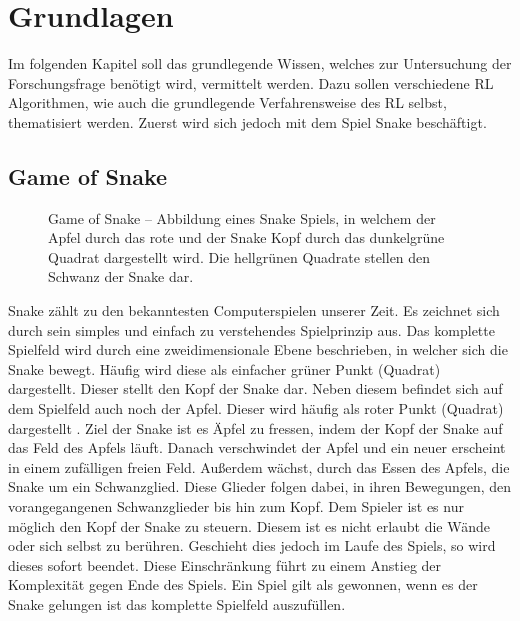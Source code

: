 
\chapter{Grundlagen}\label{chap:Grundlagen}
Im folgenden Kapitel soll das grundlegende Wissen, welches zur Untersuchung der Forschungsfrage benötigt wird, vermittelt werden. Dazu sollen verschiedene RL Algorithmen, wie auch die grundlegende Verfahrensweise des RL selbst, thematisiert werden. Zuerst wird sich jedoch mit dem Spiel Snake beschäftigt. 

\section{Game of Snake} \label{sec:Grundlagen_Game_of_Snake}
\begin{figure}[H]
	\centering
	
	\caption[Game of Snake]{Game of Snake -- Abbildung eines Snake Spiels, in welchem der Apfel durch das rote und der Snake Kopf durch das dunkelgrüne Quadrat dargestellt wird. Die hellgrünen Quadrate stellen den Schwanz der Snake dar.}
	\label{fig:Grundlagen_Game_of_Snake}
\end{figure}
Snake zählt zu den bekanntesten Computerspielen unserer Zeit. Es zeichnet sich durch sein simples und einfach zu verstehendes Spielprinzip aus.
Das komplette Spielfeld wird durch eine zweidimensionale Ebene beschrieben, in welcher sich die Snake bewegt. Häufig wird diese als einfacher grüner Punkt (Quadrat) dargestellt. Dieser stellt den Kopf der Snake dar. Neben diesem befindet sich auf dem Spielfeld auch noch der Apfel. Dieser wird häufig als roter Punkt (Quadrat) dargestellt .
Ziel der Snake ist es Äpfel zu fressen, indem der Kopf der Snake auf das Feld des Apfels läuft. Danach verschwindet der Apfel und ein neuer erscheint in einem zufälligen freien Feld. Außerdem wächst, durch das Essen des Apfels, die Snake um ein Schwanzglied. Diese Glieder folgen dabei, in ihren Bewegungen, den vorangegangenen Schwanzglieder bis hin zum Kopf. Dem Spieler ist es nur möglich den Kopf der Snake zu steuern.
Diesem ist es nicht erlaubt die Wände oder sich selbst zu berühren. Geschieht dies jedoch im Laufe des Spiels, so wird dieses sofort beendet. Diese Einschränkung führt zu einem Anstieg der Komplexität gegen Ende des Spiels. 
Ein Spiel gilt als gewonnen, wenn es der Snake gelungen ist das komplette Spielfeld auszufüllen.

